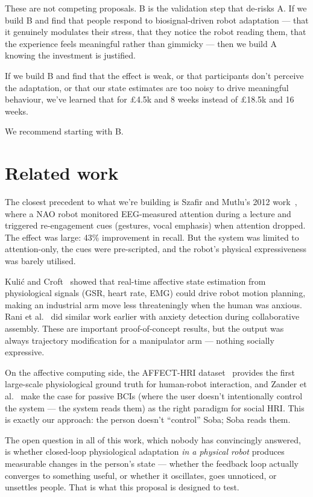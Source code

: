 \documentclass[11pt,a4paper]{article}
\begin{document}
These are not competing proposals. B is the validation step that de-risks A. If we build B and find that people respond to biosignal-driven robot adaptation --- that it genuinely modulates their stress, that they notice the robot reading them, that the experience feels meaningful rather than gimmicky --- then we build A knowing the investment is justified.

If we build B and find that the effect is weak, or that participants don't perceive the adaptation, or that our state estimates are too noisy to drive meaningful behaviour, we've learned that for \pounds 4.5k and 8 weeks instead of \pounds 18.5k and 16 weeks.

We recommend starting with B.

\section{Related work}

The closest precedent to what we're building is Szafir and Mutlu's 2012 work~\cite{szafir2012}, where a NAO robot monitored EEG-measured attention during a lecture and triggered re-engagement cues (gestures, vocal emphasis) when attention dropped. The effect was large: 43\% improvement in recall. But the system was limited to attention-only, the cues were pre-scripted, and the robot's physical expressiveness was barely utilised.

Kuli\'{c} and Croft~\cite{kulic2007} showed that real-time affective state estimation from physiological signals (GSR, heart rate, EMG) could drive robot motion planning, making an industrial arm move less threateningly when the human was anxious. Rani et al.~\cite{rani2004} did similar work earlier with anxiety detection during collaborative assembly. These are important proof-of-concept results, but the output was always trajectory modification for a manipulator arm --- nothing socially expressive.

On the affective computing side, the AFFECT-HRI dataset~\cite{affecthri2024} provides the first large-scale physiological ground truth for human-robot interaction, and Zander et al.~\cite{passivebci2020} make the case for passive BCIs (where the user doesn't intentionally control the system --- the system reads them) as the right paradigm for social HRI. This is exactly our approach: the person doesn't ``control'' Soba; Soba reads them.

The open question in all of this work, which nobody has convincingly answered, is whether closed-loop physiological adaptation \emph{in a physical robot} produces measurable changes in the person's state --- whether the feedback loop actually converges to something useful, or whether it oscillates, goes unnoticed, or unsettles people. That is what this proposal is designed to test.
\end{document}
